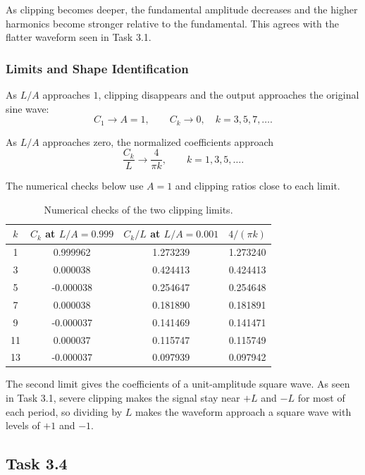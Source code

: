 \documentclass[11pt, a4paper]{article}
\begin{document}
As clipping becomes deeper, the fundamental amplitude decreases and the higher harmonics become stronger relative to the fundamental. This agrees with the flatter waveform seen in Task 3.1.

\subsubsection*{Limits and Shape Identification}

As $L/A$ approaches $1$, clipping disappears and the output approaches the original sine wave:
\[
C_1\rightarrow A=1,
\qquad
C_k\rightarrow0,\quad k=3,5,7,\ldots.
\]

As $L/A$ approaches zero, the normalized coefficients approach
\[
\frac{C_k}{L}\rightarrow\frac{4}{\pi k},
\qquad k=1,3,5,\ldots.
\]

The numerical checks below use $A=1$ and clipping ratios close to each limit.

\begin{table}[H]
    \centering
    \begin{tabular}{cccc}
        \toprule
        $k$ & $C_k$ at $L/A=0.999$ & $C_k/L$ at $L/A=0.001$ & $4/(\pi k)$ \\
        \midrule
        1  & 0.999962  & 1.273239 & 1.273240 \\
        3  & 0.000038  & 0.424413 & 0.424413 \\
        5  & -0.000038 & 0.254647 & 0.254648 \\
        7  & 0.000038  & 0.181890 & 0.181891 \\
        9  & -0.000037 & 0.141469 & 0.141471 \\
        11 & 0.000037  & 0.115747 & 0.115749 \\
        13 & -0.000037 & 0.097939 & 0.097942 \\
        \bottomrule
    \end{tabular}
    \caption{Numerical checks of the two clipping limits.}
    \label{tab:clip_limits}
\end{table}

The second limit gives the coefficients of a unit-amplitude square wave. As seen in Task 3.1, severe clipping makes the signal stay near $+L$ and $-L$ for most of each period, so dividing by $L$ makes the waveform approach a square wave with levels of $+1$ and $-1$.
\subsection*{Task 3.4}
\end{document}
